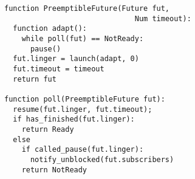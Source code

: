 \begin{figure}
\begin{lstlisting}[label=lst:future,caption=Futures adapter type (pseudocode)]
function PreemptibleFuture(Future fut,
                              Num timeout):
  function adapt():
    while poll(fut) == NotReady:
      pause()
  fut.linger = launch(adapt, 0)
  fut.timeout = timeout
  return fut

function poll(PreemptibleFuture fut):
  resume(fut.linger, fut.timeout);
  if has_finished(fut.linger):
    return Ready
  else
    if called_pause(fut.linger):
      notify_unblocked(fut.subscribers)
    return NotReady
\end{lstlisting}
\end{figure}
